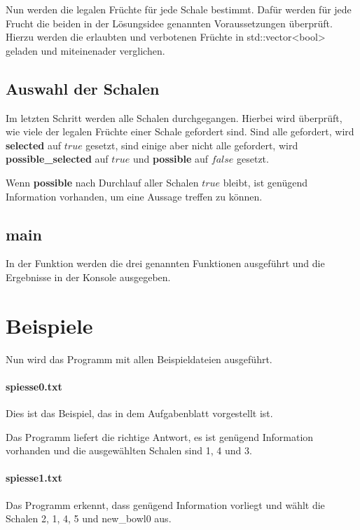 \documentclass[a4paper,10pt,ngerman]{scrartcl}
\begin{document}
Nun werden die legalen Früchte für jede Schale bestimmt.
Dafür werden für jede Frucht die beiden in der Lösungsidee genannten Voraussetzungen überprüft.
Hierzu werden die erlaubten und verbotenen Früchte in std::vector<bool> geladen und miteinenader verglichen.

\subsection{Auswahl der Schalen}
Im letzten Schritt werden alle Schalen durchgegangen.
Hierbei wird überprüft, wie viele der legalen Früchte einer Schale gefordert sind.
Sind alle gefordert, wird \textbf{selected} auf $true$ gesetzt, sind einige aber nicht alle gefordert, wird \textbf{possible\_selected} auf $true$ und \textbf{possible} auf $false$ gesetzt.

Wenn \textbf{possible} nach Durchlauf aller Schalen $true$ bleibt, ist genügend Information vorhanden, um eine Aussage treffen zu können.

\subsection{\textbf{main}}
In der  Funktion werden die drei genannten Funktionen ausgeführt und die Ergebnisse in der Konsole ausgegeben.

\section{Beispiele}
Nun wird das Programm mit allen Beispieldateien ausgeführt.

\paragraph{spiesse0.txt}
Dies ist das Beispiel, das in dem Aufgabenblatt vorgestellt ist.

Das Programm liefert die richtige Antwort, es ist genügend Information vorhanden und die ausgewählten Schalen sind 1, 4 und 3.

\paragraph{spiesse1.txt}
Das Programm erkennt, dass genügend Information vorliegt und wählt die Schalen 2, 1, 4, 5 und new\_bowl0 aus.
\end{document}
